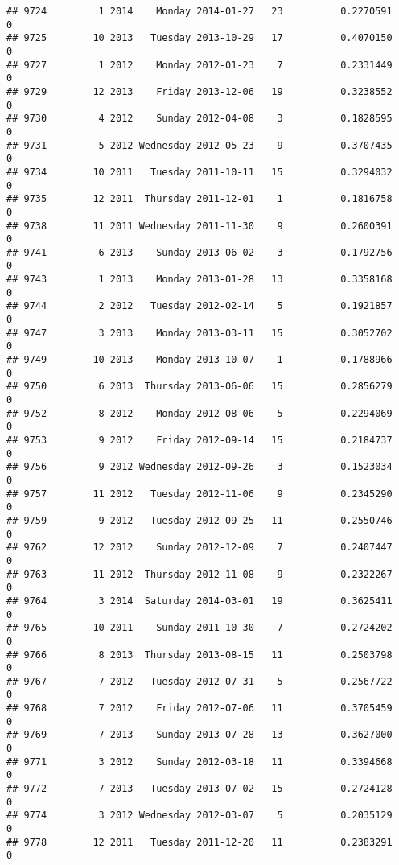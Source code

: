 \documentclass[
]{article}
\begin{document}
\begin{verbatim}
## 9724         1 2014    Monday 2014-01-27   23          0.2270591             0
## 9725        10 2013   Tuesday 2013-10-29   17          0.4070150             0
## 9727         1 2012    Monday 2012-01-23    7          0.2331449             0
## 9729        12 2013    Friday 2013-12-06   19          0.3238552             0
## 9730         4 2012    Sunday 2012-04-08    3          0.1828595             0
## 9731         5 2012 Wednesday 2012-05-23    9          0.3707435             0
## 9734        10 2011   Tuesday 2011-10-11   15          0.3294032             0
## 9735        12 2011  Thursday 2011-12-01    1          0.1816758             0
## 9738        11 2011 Wednesday 2011-11-30    9          0.2600391             0
## 9741         6 2013    Sunday 2013-06-02    3          0.1792756             0
## 9743         1 2013    Monday 2013-01-28   13          0.3358168             0
## 9744         2 2012   Tuesday 2012-02-14    5          0.1921857             0
## 9747         3 2013    Monday 2013-03-11   15          0.3052702             0
## 9749        10 2013    Monday 2013-10-07    1          0.1788966             0
## 9750         6 2013  Thursday 2013-06-06   15          0.2856279             0
## 9752         8 2012    Monday 2012-08-06    5          0.2294069             0
## 9753         9 2012    Friday 2012-09-14   15          0.2184737             0
## 9756         9 2012 Wednesday 2012-09-26    3          0.1523034             0
## 9757        11 2012   Tuesday 2012-11-06    9          0.2345290             0
## 9759         9 2012   Tuesday 2012-09-25   11          0.2550746             0
## 9762        12 2012    Sunday 2012-12-09    7          0.2407447             0
## 9763        11 2012  Thursday 2012-11-08    9          0.2322267             0
## 9764         3 2014  Saturday 2014-03-01   19          0.3625411             0
## 9765        10 2011    Sunday 2011-10-30    7          0.2724202             0
## 9766         8 2013  Thursday 2013-08-15   11          0.2503798             0
## 9767         7 2012   Tuesday 2012-07-31    5          0.2567722             0
## 9768         7 2012    Friday 2012-07-06   11          0.3705459             0
## 9769         7 2013    Sunday 2013-07-28   13          0.3627000             0
## 9771         3 2012    Sunday 2012-03-18   11          0.3394668             0
## 9772         7 2013   Tuesday 2013-07-02   15          0.2724128             0
## 9774         3 2012 Wednesday 2012-03-07    5          0.2035129             0
## 9778        12 2011   Tuesday 2011-12-20   11          0.2383291             0

\end{verbatim}
\end{document}
